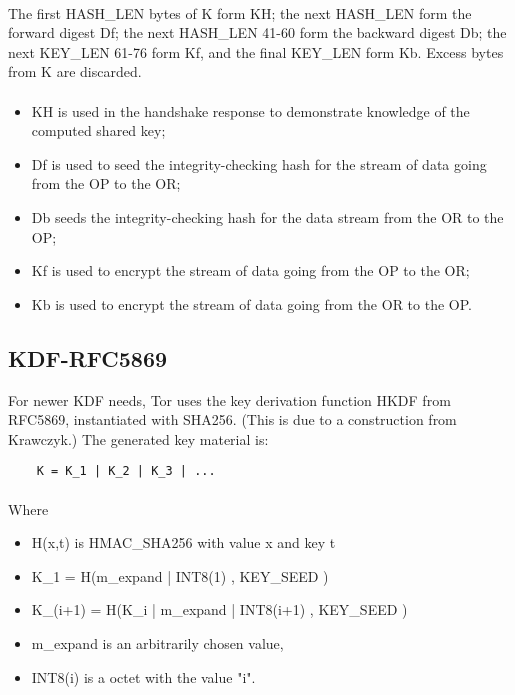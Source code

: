 \paragraph{}

The first HASH\_LEN bytes of K form KH; the next HASH\_LEN form the forward
digest Df; the next HASH\_LEN 41-60 form the backward digest Db; the next
KEY\_LEN 61-76 form Kf, and the final KEY\_LEN form Kb. Excess bytes from K
are discarded.

\paragraph{}
\begin{itemize}
    \item KH is used in the handshake response to demonstrate knowledge of the
    computed shared key;
    \item Df is used to seed the integrity-checking hash
    for the stream of data going from the OP to the OR;
    \item Db seeds the integrity-checking hash for the data stream from the OR to the OP;
    \item Kf is used to encrypt the stream of data going from the OP to the OR;
    \item Kb is used to encrypt the stream of data going from the OR to the OP.
\end{itemize}

\subsection{KDF-RFC5869}
For newer KDF needs, Tor uses the key derivation function HKDF from
RFC5869, instantiated with SHA256. (This is due to a construction
from Krawczyk.) The generated key material is:

\begin{verbatim}
    K = K_1 | K_2 | K_3 | ...
\end{verbatim}

\paragraph{}
Where

\begin{itemize}
    \item H(x,t) is HMAC\_SHA256 with value x and key t
    \item K\_1 = H(m\_expand | INT8(1) , KEY\_SEED )
    \item K\_(i+1) = H(K\_i | m\_expand | INT8(i+1) , KEY\_SEED )
    \item m\_expand is an arbitrarily chosen value,
    \item INT8(i) is a octet with the value "i".
\end{itemize}

